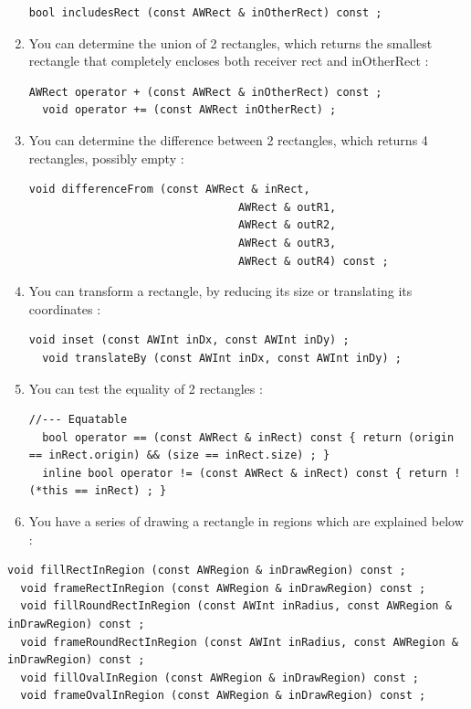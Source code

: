 \documentclass[a4paper,11pt]{extarticle}
\begin{document}
\begin{enumerate}
\begin{lstlisting}[language=Arduinonl]
  bool includesRect (const AWRect & inOtherRect) const ;
\end{lstlisting}

\item You can determine the union of 2 rectangles, which returns the smallest rectangle that completely encloses both receiver rect and inOtherRect :

\begin{lstlisting}[language=Arduinonl]
  AWRect operator + (const AWRect & inOtherRect) const ;
  void operator += (const AWRect inOtherRect) ;
\end{lstlisting}

\item You can determine the difference between 2 rectangles, which returns 4 rectangles, possibly empty :

\begin{lstlisting}[language=Arduinonl]
  void differenceFrom (const AWRect & inRect,
                                AWRect & outR1,
                                AWRect & outR2,
                                AWRect & outR3,
                                AWRect & outR4) const ;
\end{lstlisting}

\item You can transform a rectangle, by reducing its size or translating its coordinates :

\begin{lstlisting}[language=Arduinonl]
  void inset (const AWInt inDx, const AWInt inDy) ;
  void translateBy (const AWInt inDx, const AWInt inDy) ;
\end{lstlisting}

\item You can test the equality of 2 rectangles :

\begin{lstlisting}[language=Arduinonl]
//--- Equatable
  bool operator == (const AWRect & inRect) const { return (origin == inRect.origin) && (size == inRect.size) ; }
  inline bool operator != (const AWRect & inRect) const { return ! (*this == inRect) ; }
\end{lstlisting}

\item You have a series of  drawing a rectangle in regions which are explained below :
\end{enumerate}

\begin{lstlisting}[language=Arduinonl]
  void fillRectInRegion (const AWRegion & inDrawRegion) const ;
  void frameRectInRegion (const AWRegion & inDrawRegion) const ;
  void fillRoundRectInRegion (const AWInt inRadius, const AWRegion & inDrawRegion) const ;
  void frameRoundRectInRegion (const AWInt inRadius, const AWRegion & inDrawRegion) const ;
  void fillOvalInRegion (const AWRegion & inDrawRegion) const ;
  void frameOvalInRegion (const AWRegion & inDrawRegion) const ;
\end{lstlisting}
\end{document}
